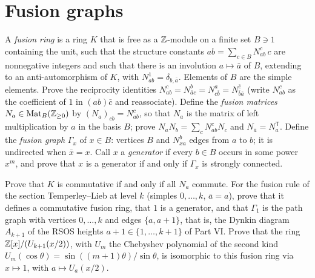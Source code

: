 \section{Fusion graphs}

\begin{exercise}
A \emph{fusion ring} is a ring $K$ that is free as a $\mathbb Z$-module on a finite set $B\ni1$ containing the unit, such that the structure constants $ab=\sum_{c\in B}N_{ab}^c\,c$ are nonnegative integers and such that there is an involution $a\mapsto\bar a$ of $B$, extending to an anti-automorphism of $K$, with $N_{ab}^1=\delta_{b,\bar a}$. Elements of $B$ are the simple elements. Prove the reciprocity identities $N_{ab}^c=N_{\bar a c}^b=N_{c\bar b}^a=N_{\bar b\bar a}^{\bar c}$ (write $N_{ab}^c$ as the coefficient of $1$ in $(ab)\bar c$ and reassociate). Define the \emph{fusion matrices} $N_a\in\operatorname{Mat}_B(\mathbb Z_{\ge0})$ by $(N_a)_{cb}=N_{ab}^c$, so that $N_a$ is the matrix of left multiplication by $a$ in the basis $B$; prove $N_aN_b=\sum_cN_{ab}^cN_c$ and $N_{\bar a}=N_a^{\mathsf T}$. Define the \emph{fusion graph} $\Gamma_x$ of $x\in B$: vertices $B$ and $N_{xa}^b$ edges from $a$ to $b$; it is undirected when $\bar x=x$. Call $x$ a \emph{generator} if every $b\in B$ occurs in some power $x^m$, and prove that $x$ is a generator if and only if $\Gamma_x$ is strongly connected.

Prove that $K$ is commutative if and only if all $N_a$ commute. For the fusion rule of the section Temperley--Lieb at level $k$ (simples $0,\dots,k$, $\bar a=a$), prove that it defines a commutative fusion ring, that $1$ is a generator, and that $\Gamma_1$ is the path graph with vertices $0,\dots,k$ and edges $\{a,a+1\}$, that is, the Dynkin diagram $A_{k+1}$ of the RSOS heights $a+1\in\{1,\dots,k+1\}$ of Part VI. Prove that the ring $\mathbb Z[x]/(U_{k+1}(x/2))$, with $U_m$ the Chebyshev polynomial of the second kind $U_m(\cos\theta)=\sin((m+1)\theta)/\sin\theta$, is isomorphic to this fusion ring via $x\mapsto1$, with $a\mapsto U_a(x/2)$.
\end{exercise}

